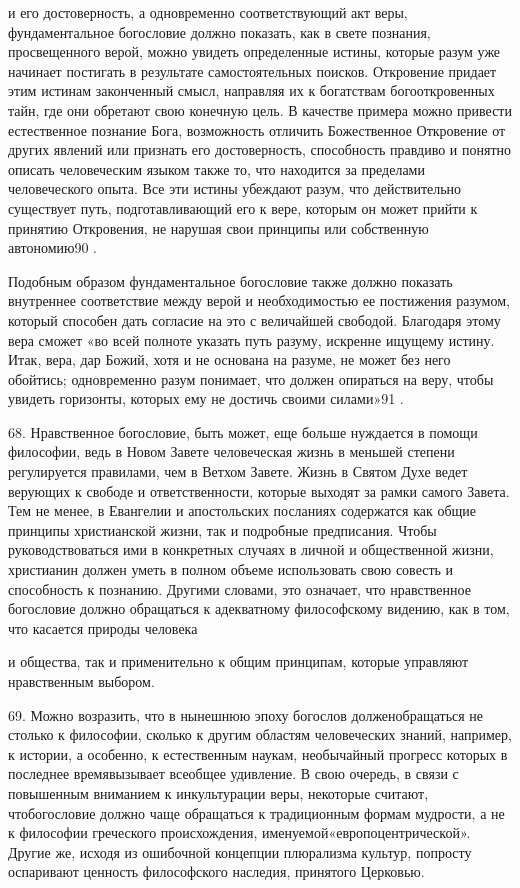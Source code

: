 \documentclass[a5paper,10pt]{article}
\begin{document}
и его достоверность, а одновременно соответствующий акт веры, фундаментальное
богословие должно показать, как в свете познания, просвещенного верой, можно
увидеть определенные истины, которые разум уже начинает постигать в результате
самостоятельных поисков. Откровение придает этим истинам законченный смысл,
направляя их к богатствам богооткровенных тайн, где они обретают свою конечную
цель. В качестве примера можно привести естественное познание Бога, возможность
отличить Божественное Откровение от других явлений или признать его
достоверность, способность правдиво и понятно описать человеческим языком также
то, что находится за пределами человеческого опыта. Все эти истины убеждают
разум, что действительно существует путь, подготавливающий его к вере, которым
он может прийти к принятию Откровения, не нарушая свои принципы или собственную
автономию90 .

Подобным образом фундаментальное богословие также должно показать внутреннее
соответствие между верой и необходимостью ее постижения разумом, который
способен дать согласие на это с величайшей свободой. Благодаря этому вера
сможет «во всей полноте указать путь разуму, искренне ищущему истину. Итак,
вера, дар Божий, хотя и не основана на разуме, не может без него обойтись;
одновременно разум понимает, что должен опираться на веру, чтобы увидеть
горизонты, которых ему не достичь своими силами»91 .

68. Нравственное богословие, быть может, еще больше нуждается в помощи
философии, ведь в Новом Завете человеческая жизнь в меньшей степени
регулируется правилами, чем в Ветхом Завете. Жизнь в Святом Духе ведет верующих
к свободе и ответственности, которые выходят за рамки самого Завета. Тем не
менее, в Евангелии и апостольских посланиях содержатся как общие принципы
христианской жизни, так и подробные предписания. Чтобы руководствоваться ими в
конкретных случаях в личной и общественной жизни, христианин должен уметь в
полном объеме использовать свою совесть и способность к познанию. Другими
словами, это означает, что нравственное богословие должно обращаться к
адекватному философскому видению, как в том, что касается природы человека

и общества, так и применительно к общим принципам, которые управляют
нравственным выбором.

69. Можно возразить, что в нынешнюю эпоху богослов долженобращаться не столько
к философии, сколько к другим областям человеческих знаний, например, к
истории, а особенно, к естественным наукам, необычайный прогресс которых в
последнее времявызывает всеобщее удивление. В свою очередь, в связи с
повышенным вниманием к инкультурации веры, некоторые считают, чтобогословие
должно чаще обращаться к традиционным формам мудрости, а не к философии
греческого происхождения, именуемой«европоцентрической». Другие же, исходя из
ошибочной концепции плюрализма культур, попросту оспаривают ценность
философского наследия, принятого Церковью.
\end{document}
